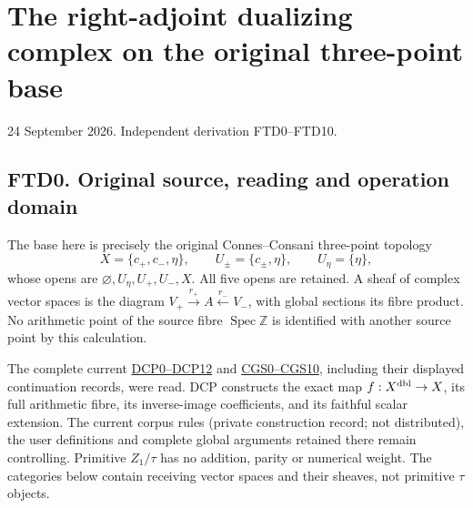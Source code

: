 \section{The right-adjoint dualizing complex on the original three-point
base}\label{the-right-adjoint-dualizing-complex-on-the-original-three-point-base}

24 September 2026. Independent derivation FTD0--FTD10.

\subsection{FTD0. Original source, reading and operation
domain}\label{ftd0.-original-source-reading-and-operation-domain}

The base here is precisely the original Connes--Consani three-point
topology \[
X=\{c_+,c_-,\eta\},\qquad
U_\pm=\{c_\pm,\eta\},\qquad U_\eta=\{\eta\},
\] whose opens are \(\varnothing,U_\eta,U_+,U_-,X\). All five opens are
retained. A sheaf of complex vector spaces is the diagram
\(V_+\xrightarrow{r_+}A\xleftarrow{r_-}V_-\), with global sections its
fibre product. No arithmetic point of the source fibre
\(\operatorname{Spec}\mathbb Z\) is identified with another source point
by this calculation.

The complete current
\href{https://github.com/KokunoYumeto/zeta-function-research-reader/blob/36a82ecca98addb8a98b48204e349737856c7223/workbenches/splitzero-tandem/continuations/20260924-cohomology-weight-and-character-lifts/original-character-lifting/tau_lifting_weights_20260924/SOURCE_CC_DOUBLE_PULLBACK.md}{DCP0--DCP12}
and
\href{https://github.com/KokunoYumeto/zeta-function-research-reader/blob/36a82ecca98addb8a98b48204e349737856c7223/workbenches/splitzero-tandem/continuations/20260924-cohomology-weight-and-character-lifts/original-character-lifting/tau_lifting_weights_20260924/SOURCE_COEFFICIENT_GLUE.md}{CGS0--CGS10},
including their displayed continuation records, were read. DCP
constructs the exact map \(f:X^{\rm dbl}\to X\), its full arithmetic
fibre, its inverse-image coefficients, and its faithful scalar
extension. The current corpus rules (private construction record; not
distributed), the user definitions and complete global arguments
retained there remain controlling. Primitive \(Z_1/\tau\) has no
addition, parity or numerical weight. The categories below contain
receiving vector spaces and their sheaves, not primitive \(\tau\)
objects.


